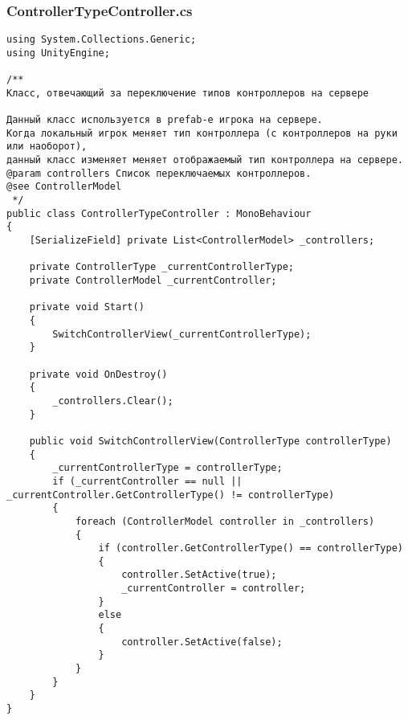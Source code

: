 \subsubsection*{ControllerTypeController.cs}
\begin{verbatim}
﻿using System.Collections.Generic;
using UnityEngine;

/**
Класс, отвечающий за переключение типов контроллеров на сервере

Данный класс используется в prefab-е игрока на сервере. 
Когда локальный игрок меняет тип контроллера (с контроллеров на руки или наоборот), 
данный класс изменяет меняет отображаемый тип контроллера на сервере.
@param controllers Список переключаемых контроллеров.
@see ControllerModel
 */
public class ControllerTypeController : MonoBehaviour
{
    [SerializeField] private List<ControllerModel> _controllers;

    private ControllerType _currentControllerType;
    private ControllerModel _currentController;

    private void Start()
    {
        SwitchControllerView(_currentControllerType);
    }

    private void OnDestroy()
    {
        _controllers.Clear();
    }

    public void SwitchControllerView(ControllerType controllerType)
    {
        _currentControllerType = controllerType;
        if (_currentController == null || _currentController.GetControllerType() != controllerType)
        {
            foreach (ControllerModel controller in _controllers)
            {
                if (controller.GetControllerType() == controllerType)
                {
                    controller.SetActive(true);
                    _currentController = controller;
                }
                else
                {
                    controller.SetActive(false);
                }
            }
        }
    }
}

\end{verbatim}
